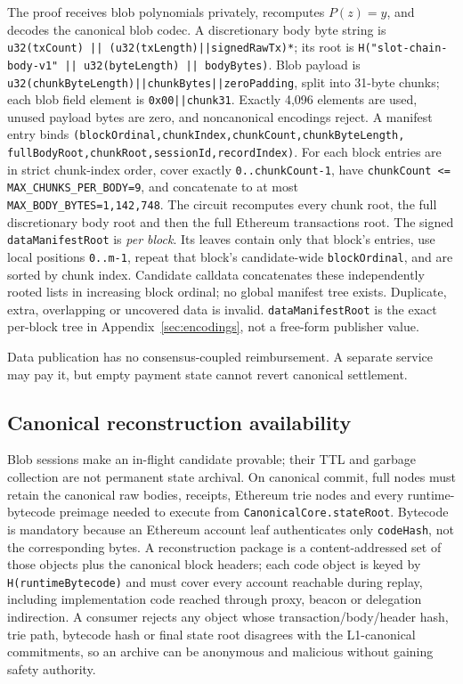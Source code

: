 \documentclass[a4paper,11pt]{article}
\newcommand{\code}[1]{\nolinkurl{#1}}
\begin{document}
The proof receives blob polynomials privately, recomputes $P(z)=y$, and decodes
the canonical blob codec.  A discretionary body byte string is
\code{u32(txCount) || (u32(txLength)||signedRawTx)*}; its root is
\code{H("slot-chain-body-v1" || u32(byteLength) || bodyBytes)}.  Blob payload is
\code{u32(chunkByteLength)||chunkBytes||zeroPadding}, split into 31-byte chunks; each
blob field element is \code{0x00||chunk31}.  Exactly 4,096 elements are used,
unused payload bytes are zero, and noncanonical encodings reject.  A manifest
entry binds \code{(blockOrdinal,chunkIndex,chunkCount,chunkByteLength,
fullBodyRoot,chunkRoot,sessionId,recordIndex)}.  For each block entries are in
strict chunk-index order, cover exactly \code{0..chunkCount-1}, have
\code{chunkCount <= MAX_CHUNKS_PER_BODY=9}, and concatenate to at most
\code{MAX_BODY_BYTES=1,142,748}.  The circuit recomputes every chunk root, the
full discretionary body root and then the full Ethereum transactions root.
The signed \code{dataManifestRoot} is \emph{per block}.  Its leaves contain
only that block's entries, use local positions \code{0..m-1}, repeat that
block's candidate-wide \code{blockOrdinal}, and are sorted by chunk index.
Candidate calldata concatenates these independently rooted lists in increasing
block ordinal; no global manifest tree exists.  Duplicate, extra, overlapping
or uncovered data is invalid.  \code{dataManifestRoot} is the exact per-block
tree in Appendix~\ref{sec:encodings}, not a free-form publisher value.

Data publication has no consensus-coupled reimbursement.  A separate service
may pay it, but empty payment state cannot revert canonical settlement.

\subsection{Canonical reconstruction availability}

Blob sessions make an in-flight candidate provable; their TTL and garbage
collection are not permanent state archival.  On canonical commit, full nodes
must retain the canonical raw bodies, receipts, Ethereum trie nodes and every
runtime-bytecode preimage needed to execute from
\code{CanonicalCore.stateRoot}.  Bytecode is mandatory because an Ethereum
account leaf authenticates only \code{codeHash}, not the corresponding bytes.
A reconstruction package is a content-addressed set of those objects plus the
canonical block headers; each code object is keyed by
\code{H(runtimeBytecode)} and must cover every account reachable during replay,
including implementation code reached through proxy, beacon or delegation
indirection.  A consumer rejects any object whose transaction/body/header
hash, trie path, bytecode hash or final state root disagrees with the
L1-canonical commitments, so an archive can be anonymous and malicious without
gaining safety authority.
\end{document}
